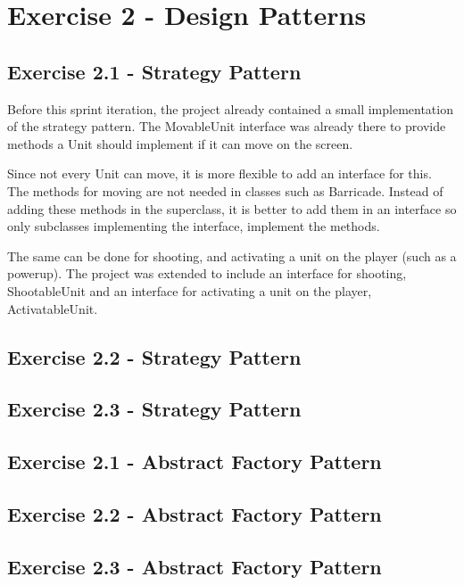\documentclass[10pt]{article}
\begin{document}
\section{Exercise 2 - Design Patterns}
\subsection{Exercise 2.1 - Strategy Pattern}
Before this sprint iteration, the project already contained a small implementation of the strategy pattern. The MovableUnit interface was already there to provide methods a Unit should implement if it can move on the screen. 

Since not every Unit can move, it is more flexible to add an interface for this. 
The methods for moving are not needed in classes such as Barricade. 
Instead of adding these methods in the superclass, it is better to add them in an interface so only subclasses implementing the interface, implement the methods.

The same can be done for shooting, and activating a unit on the player (such as a powerup).
The project was extended to include an interface for shooting, ShootableUnit and an interface for activating a unit on the player, ActivatableUnit. 

\subsection{Exercise 2.2 - Strategy Pattern}

\subsection{Exercise 2.3 - Strategy Pattern}

\subsection{Exercise 2.1 - Abstract Factory Pattern}

\subsection{Exercise 2.2 - Abstract Factory Pattern}

\subsection{Exercise 2.3 - Abstract Factory Pattern}
\end{document}
